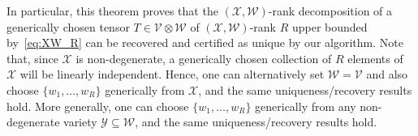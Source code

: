 \documentclass[11pt]{article}
\theoremstyle{definition}
\newcommand\X{\mathcal{X}}
\newcommand\Y{\mathcal{Y}}
\newcommand\W{\mathcal{W}}
\newcommand\A{\mathcal{A}}
\newcommand\B{\mathcal{B}}
\newcommand\V{\mathcal{V}}
\newcommand\U{\mathcal{U}}
\DeclareMathOperator{\spn}{span}
\begin{document}
In particular, this theorem proves that the $(\X,\W)$-rank decomposition of a generically chosen tensor $T \in \V \otimes \W$ of $(\X,\W)$-rank $R$ upper bounded by~\eqref{eq:XW_R} can be recovered and certified as unique by our algorithm. Note that, since $\X$ is non-degenerate, a generically chosen collection of $R$ elements of $\X$ will be linearly independent. Hence, one can alternatively set $\W=\V$ and also choose $\{w_1,\dots, w_R\}$ generically from $\X$, and the same uniqueness/recovery results hold. More generally, one can choose $\{w_1,\dots, w_R\}$ generically from any non-degenerate variety $\Y \subseteq \W$, and the same uniqueness/recovery results hold.

%
%
%
%
\end{document}
